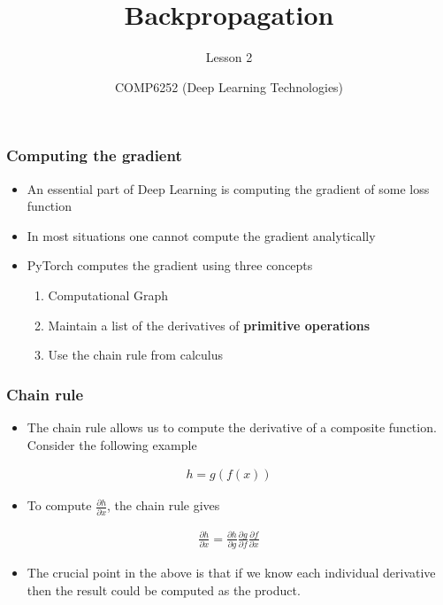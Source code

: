 \documentclass{beamer}
\title{Backpropagation}
\subtitle{Lesson 2}
\author{COMP6252 (Deep Learning Technologies)}
\institute[ECS, University of Southampton]{ECS, University of Southampton} \date{}
\theoremstyle{plain} %
\theoremstyle{example} %
\newcommand{\deriv}[2]{\ensuremath{\frac{\partial #1}{\partial #2}}}
\begin{document}
\begin{frame}
\placelogofalse %
\titlepage
\end{frame}

\placelogotrue %
\begin{frame}
    \frametitle{Computing the gradient}
\begin{itemize}
    \item An essential part of Deep Learning is computing the gradient of some loss function
    \item In most situations one cannot compute the gradient analytically
    \item PyTorch computes the gradient using three concepts
    \begin{enumerate}
        \item Computational Graph
        \item Maintain a list of the derivatives of \textbf{primitive operations}
        \item Use the chain rule from calculus
    \end{enumerate}
\end{itemize}
    

\end{frame}


\begin{frame}
    \frametitle{Chain rule}
\begin{itemize}
    \item The chain rule allows us to compute the derivative of a composite function. Consider the following example
\end{itemize}
\begin{align*}
    h=g(f(x))
\end{align*}
\begin{itemize}
    \item To  compute $\deriv{h}{x}$, the chain rule gives
\end{itemize}    
\begin{align*}
    \deriv{h}{x}=\deriv{h}{g}\deriv{g}{f}\deriv{f}{x}
\end{align*}
\begin{itemize}
    \item The crucial point in the above is that if we know each individual derivative then the result could be computed as the product.
\end{itemize}
\end{frame}
\end{document}
